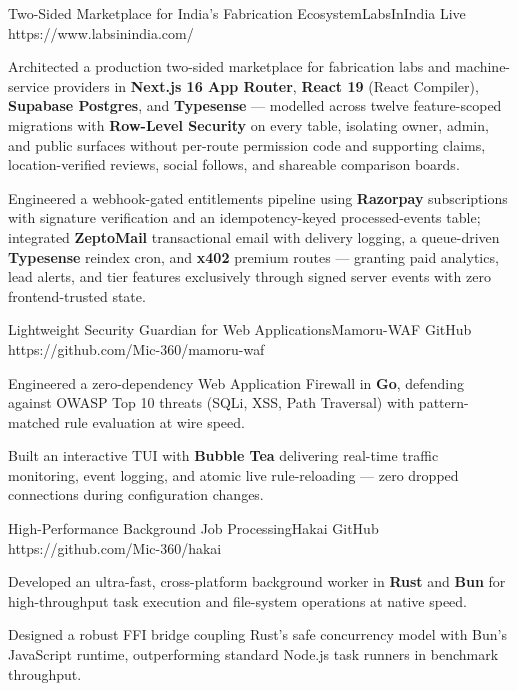 \documentclass{bhaumic}
\begin{document}
\begin{samepage}
\projentry
  {Two-Sided Marketplace for India's Fabrication Ecosystem}{LabsInIndia}
  {Live}
  {https://www.labsinindia.com/}
  {
    \begin{resbullets}
      \item Architected a production two-sided marketplace for fabrication labs and machine-service providers in \textbf{Next.js 16 App Router}, \textbf{React 19} (React Compiler), \textbf{Supabase Postgres}, and \textbf{Typesense} — modelled across twelve feature-scoped migrations with \textbf{Row-Level Security} on every table, isolating owner, admin, and public surfaces without per-route permission code and supporting claims, location-verified reviews, social follows, and shareable comparison boards.
      \item Engineered a webhook-gated entitlements pipeline using \textbf{Razorpay} subscriptions with signature verification and an idempotency-keyed processed-events table; integrated \textbf{ZeptoMail} transactional email with delivery logging, a queue-driven \textbf{Typesense} reindex cron, and \textbf{x402} premium routes — granting paid analytics, lead alerts, and tier features exclusively through signed server events with zero frontend-trusted state.
    \end{resbullets}
  }
\end{samepage}

\begin{samepage}
\projentry
  {Lightweight Security Guardian for Web Applications}{Mamoru-WAF}
  {GitHub}
  {https://github.com/Mic-360/mamoru-waf}
  {
    \begin{resbullets}
      \item Engineered a zero-dependency Web Application Firewall in \textbf{Go}, defending against OWASP Top 10 threats (SQLi, XSS, Path Traversal) with pattern-matched rule evaluation at wire speed.
      \item Built an interactive TUI with \textbf{Bubble Tea} delivering real-time traffic monitoring, event logging, and atomic live rule-reloading — zero dropped connections during configuration changes.
    \end{resbullets}
  }
\end{samepage}

\begin{samepage}
\projentry
  {High-Performance Background Job Processing}{Hakai}
  {GitHub}
  {https://github.com/Mic-360/hakai}
  {
    \begin{resbullets}
      \item Developed an ultra-fast, cross-platform background worker in \textbf{Rust} and \textbf{Bun} for high-throughput task execution and file-system operations at native speed.
      \item Designed a robust FFI bridge coupling Rust's safe concurrency model with Bun's JavaScript runtime, outperforming standard Node.js task runners in benchmark throughput.
    \end{resbullets}
  }
\end{samepage}
\end{document}
